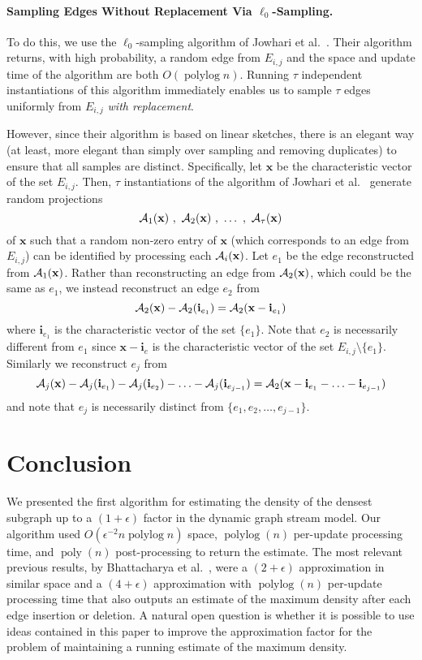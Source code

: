 \documentclass[11pt]{article}
\DeclareMathOperator{\polylog}{polylog}
\DeclareMathOperator{\poly}{poly}
\newcommand{\A}{{\cal A}}
\newcommand{\bx}{\mathbf{x}}
\newcommand{\bi}{\mathbf{i}}
\begin{document}
\paragraph{Sampling Edges Without Replacement Via $\ell_0$-Sampling.} To do this, we use the $\ell_0$-sampling algorithm of Jowhari et al.~\cite{JowhariST11}. Their algorithm returns, with high probability, a random edge from $E_{i,j}$ and the space and update time of the algorithm are both $O(\polylog n)$. Running $\tau$ independent instantiations of this algorithm immediately enables us to sample $\tau$ edges uniformly from $E_{i,j}$ \emph{with replacement}. 

However, since their algorithm is based on linear sketches, there is an elegant way (at least, more elegant than simply over sampling and removing duplicates) to ensure that all samples are distinct. Specifically, let $\bx$ be the characteristic vector of the set $E_{i,j}$. Then, $\tau$ instantiations of the algorithm of Jowhari et al.~\cite{JowhariST11} generate random projections  \[\A_1 (\bx)~, ~\A_2 (\bx)~,~ \ldots~,~ \A_\tau (\bx)\] of $\bx$ such that a random non-zero entry of $\bx$ (which corresponds to an edge from $E_{i,j}$) can be identified by processing each $\A_i (\bx)$. Let $e_1$ be the edge reconstructed from $\A_1( \bx)$. Rather than reconstructing an edge from $\A_2 (\bx )$, which could be the same as $e_1$, we instead reconstruct an edge $e_2$ from 
\[\A_2 (\bx)-\A_2 (\bi_{e_1})=\A_2 (\bx-\bi_{e_1})\] where $\bi_{e_1}$ is the characteristic vector of the set $\{e_1\}$. Note that $e_2$ is necessarily different from $e_1$ since $\bx-\bi_e$ is the characteristic vector of the set $E_{i,j}\setminus \{e_1\}$. Similarly we reconstruct $e_j$ from 
\[\A_j (\bx)-\A_j (\bi_{e_1})-\A_j (\bi_{e_2})-\ldots - \A_j (\bi_{e_{j-1}})=\A_2 (\bx-\bi_{e_1}-\ldots - \bi_{e_{j-1}})\]
and note that $e_j$ is necessarily distinct from $\{e_1, e_2,\ldots, e_{j-1}\}$.

\section{Conclusion}
We presented the first algorithm for estimating the density of the densest subgraph up to a $(1+\epsilon )$ factor  in the dynamic graph stream model. Our algorithm used $O(\epsilon^{-2} n \polylog n)$ space, $\polylog (n)$ per-update processing time, and $\poly(n)$ post-processing to return the estimate. The most relevant previous results, by Bhattacharya et al.~\cite{BhattacharyaHNT15}, were a $(2+\epsilon)$ approximation in similar space and a $(4+\epsilon)$ approximation with $\polylog (n)$ per-update processing time that also outputs an estimate of the maximum density after each edge insertion or deletion. A natural open question is whether it is possible to use ideas contained in this paper to improve the approximation factor for the problem of maintaining a running estimate of the maximum density.

{ \small
 
}
\end{document}
